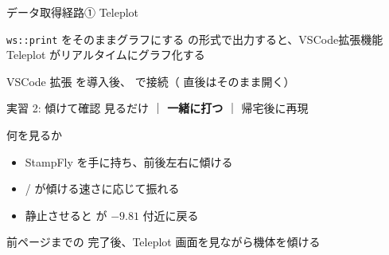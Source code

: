 \begin{frame}[fragile]{データ取得経路① Teleplot}
  \begin{block}{\texttt{ws::print} をそのままグラフにする}
    \small {} の形式で出力すると、VSCode拡張機能 Teleplot がリアルタイムにグラフ化する
  \end{block}


  \vspace{-4.5mm}

  {\footnotesize VSCode 拡張  を導入後、 で接続（ 直後はそのまま開く）}
\end{frame}

\begin{frame}[fragile]{実習 2: 傾けて確認}
  \vspace{0.15em}
  {\small 見るだけ ｜ \textcolor{sfblue}{\textbf{一緒に打つ}} ｜ 帰宅後に再現}

  \vspace{0.3em}

  \begin{block}{何を見るか}
    \begin{itemize}\small
      \item StampFly を手に持ち、前後左右に傾ける
      \item {}/ が傾ける速さに応じて振れる
      \item 静止させると  が $-9.81$ 付近に戻る
    \end{itemize}
  \end{block}

  {\footnotesize 前ページまでの  完了後、Teleplot 画面を見ながら機体を傾ける}
\end{frame}

